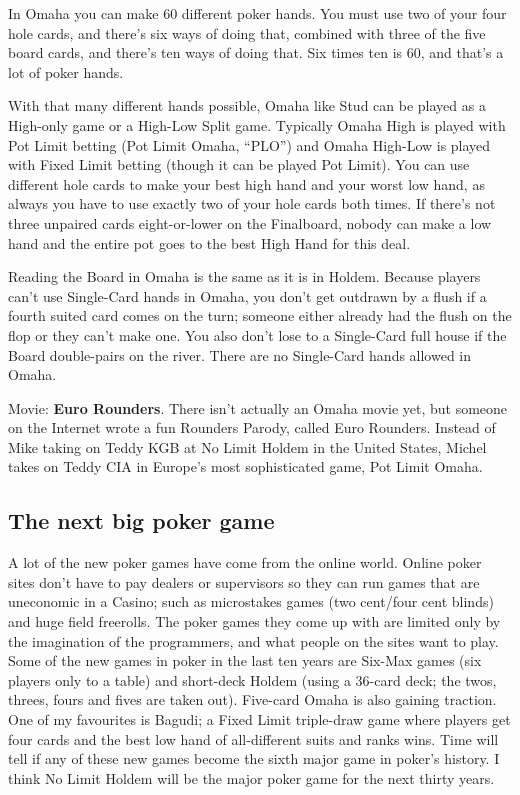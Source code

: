 In Omaha you can make 60 different poker hands. You must use two of
your four hole cards, and there's six ways of doing that, combined
with three of the five board cards, and there's ten ways of doing
that. Six times ten is 60, and that's a lot of poker hands.

With that many different hands possible, Omaha like Stud can be played
as a High-only game or a High-Low Split game. Typically Omaha High is
played with Pot Limit betting (Pot Limit Omaha, ``PLO'') and Omaha
High-Low is played with Fixed Limit betting (though it can be played
Pot Limit). You can use different hole cards to make your best high
hand and your worst low hand, as always you have to use exactly two of
your hole cards both times. If there's not three unpaired cards
eight-or-lower on the Finalboard, nobody can make a low hand and the
entire pot goes to the best High Hand for this deal.

Reading the Board in Omaha is the same as it is in Holdem. Because
players can't use Single-Card hands in Omaha, you don't get outdrawn
by a flush if a fourth suited card comes on the turn; someone either
already had the flush on the flop or they can't make one. You also
don't lose to a Single-Card full house if the Board double-pairs on
the river. There are no Single-Card hands allowed in Omaha.

Movie: \textbf{Euro Rounders}. There isn't actually an Omaha movie
yet, but someone on the Internet wrote a fun Rounders Parody, called
Euro Rounders. Instead of Mike taking on Teddy KGB at No Limit Holdem
in the United States, Michel takes on Teddy CIA in Europe's most
sophisticated game, Pot Limit Omaha.

\subsection{The next big poker game}

A lot of the new poker games have come from the online world. Online
poker sites don't have to pay dealers or supervisors so they can run
games that are uneconomic in a Casino; such as microstakes games (two
cent/four cent blinds) and huge field freerolls. The poker games they
come up with are limited only by the imagination of the programmers,
and what people on the sites want to play. Some of the new games
in poker in the last ten years are Six-Max games (six players only to
a table) and short-deck Holdem (using a 36-card deck; the twos,
threes, fours and fives are taken out). Five-card Omaha is also
gaining traction. One of my favourites is Bagudi; a Fixed Limit
triple-draw game where players get four cards and the best low hand of
all-different suits and ranks wins. Time will tell if any of these new
games become the sixth major game in poker's history. I think No Limit
Holdem will be the major poker game for the next thirty years.

